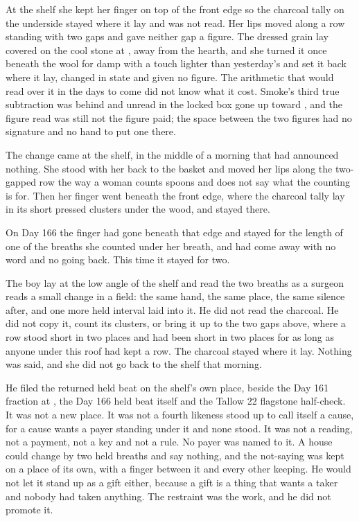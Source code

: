 At the shelf she kept her finger on top of the front edge so the charcoal tally on the underside stayed where it lay and was not read. Her lips moved along a row standing with two gaps and gave neither gap a figure. The dressed grain lay covered on the cool stone at , away from the hearth, and she turned it once beneath the wool for damp with a touch lighter than yesterday's and set it back where it lay, changed in state and given no figure. The arithmetic that would read over it in the days to come did not know what it cost. Smoke's third true subtraction was behind and unread in the locked box gone up  toward , and the figure read was still not the figure paid; the space between the two figures had no signature and no hand to put one there.

\scenebreak

The change came at the shelf, in the middle of a morning that had announced nothing. She stood with her back to the basket and moved her lips along the two-gapped row the way a woman counts spoons and does not say what the counting is for. Then her finger went beneath the front edge, where the charcoal tally lay in its short pressed clusters under the wood, and stayed there.

On Day 166 the finger had gone beneath that edge and stayed for the length of one of the breaths she counted under her breath, and had come away with no word and no going back. This time it stayed for two.

The boy lay at the low angle of the shelf and read the two breaths as a surgeon reads a small change in a field: the same hand, the same place, the same silence after, and one more held interval laid into it. He did not read the charcoal. He did not copy it, count its clusters, or bring it up to the two gaps above, where a row stood short in two places and had been short in two places for as long as anyone under this roof had kept a row. The charcoal stayed where it lay. Nothing was said, and she did not go back to the shelf that morning.

He filed the returned held beat on the shelf's own place, beside the Day 161 fraction at , the Day 166 held beat itself and the Tallow 22 flagstone half-check. It was not a new place. It was not a fourth likeness stood up to call itself a cause, for a cause wants a payer standing under it and none stood. It was not a reading, not a payment, not a key and not a rule. No payer was named to it. A house could change by two held breaths and say nothing, and the not-saying was kept on a place of its own, with a finger between it and every other keeping. He would not let it stand up as a gift either, because a gift is a thing that wants a taker and nobody had taken anything. The restraint was the work, and he did not promote it.

